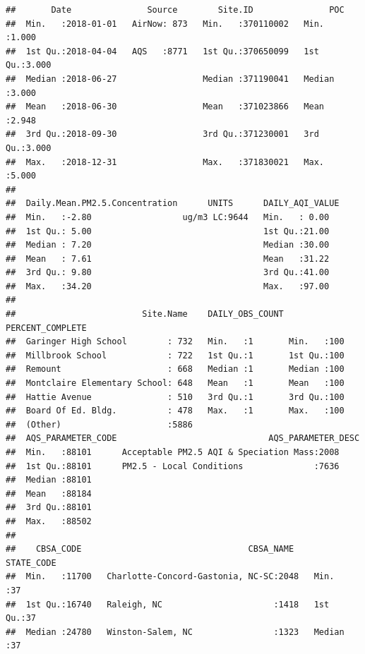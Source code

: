 \documentclass[12pt,]{article}
\begin{document}
\begin{verbatim}
##       Date               Source        Site.ID               POC       
##  Min.   :2018-01-01   AirNow: 873   Min.   :370110002   Min.   :1.000  
##  1st Qu.:2018-04-04   AQS   :8771   1st Qu.:370650099   1st Qu.:3.000  
##  Median :2018-06-27                 Median :371190041   Median :3.000  
##  Mean   :2018-06-30                 Mean   :371023866   Mean   :2.948  
##  3rd Qu.:2018-09-30                 3rd Qu.:371230001   3rd Qu.:3.000  
##  Max.   :2018-12-31                 Max.   :371830021   Max.   :5.000  
##                                                                        
##  Daily.Mean.PM2.5.Concentration      UNITS      DAILY_AQI_VALUE
##  Min.   :-2.80                  ug/m3 LC:9644   Min.   : 0.00  
##  1st Qu.: 5.00                                  1st Qu.:21.00  
##  Median : 7.20                                  Median :30.00  
##  Mean   : 7.61                                  Mean   :31.22  
##  3rd Qu.: 9.80                                  3rd Qu.:41.00  
##  Max.   :34.20                                  Max.   :97.00  
##                                                                
##                         Site.Name    DAILY_OBS_COUNT PERCENT_COMPLETE
##  Garinger High School        : 732   Min.   :1       Min.   :100     
##  Millbrook School            : 722   1st Qu.:1       1st Qu.:100     
##  Remount                     : 668   Median :1       Median :100     
##  Montclaire Elementary School: 648   Mean   :1       Mean   :100     
##  Hattie Avenue               : 510   3rd Qu.:1       3rd Qu.:100     
##  Board Of Ed. Bldg.          : 478   Max.   :1       Max.   :100     
##  (Other)                     :5886                                   
##  AQS_PARAMETER_CODE                              AQS_PARAMETER_DESC
##  Min.   :88101      Acceptable PM2.5 AQI & Speciation Mass:2008    
##  1st Qu.:88101      PM2.5 - Local Conditions              :7636    
##  Median :88101                                                     
##  Mean   :88184                                                     
##  3rd Qu.:88101                                                     
##  Max.   :88502                                                     
##                                                                    
##    CBSA_CODE                                 CBSA_NAME      STATE_CODE
##  Min.   :11700   Charlotte-Concord-Gastonia, NC-SC:2048   Min.   :37  
##  1st Qu.:16740   Raleigh, NC                      :1418   1st Qu.:37  
##  Median :24780   Winston-Salem, NC                :1323   Median :37  

\end{verbatim}
\end{document}
